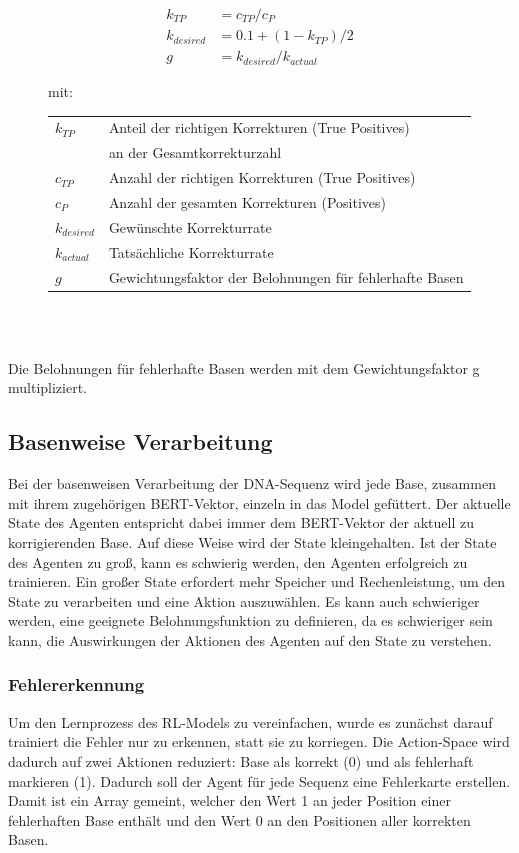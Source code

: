 \documentclass[oneside,bibliography=totocnumbered,BCOR=5mm]{scrbook}%
\makeatletter
\theoremstyle{definition}
\theoremstyle{definition}
\theoremstyle{definition}
\theoremstyle{definition}
\theoremstyle{definition}
\theoremstyle{definition}
\newenvironment{conditions}[1][mit:]
  {#1 \begin{tabular}[t]{>{$}l<{$} @{${}={}$} l}}
  {\end{tabular}\\[\belowdisplayskip]}
\makeatother
\begin{document}
\begin{figure}
  \begin{align*}
    k_{TP} &= c_{TP} / c_{P} \\
    k_{desired} &= 0.1 + (1 - k_{TP} ) / 2 \\
    g &= k_{desired} / k_{actual}
  \end{align*} 
  
  \begin{conditions}
    k_{TP}      & Anteil der richtigen Korrekturen (True Positives) \\
                & an der Gesamtkorrekturzahl \\
    c_{TP}      & Anzahl der richtigen Korrekturen (True Positives) \\
    c_{P}       & Anzahl der gesamten Korrekturen (Positives) \\
    k_{desired} & Gewünschte Korrekturrate \\
    k_{actual}  & Tatsächliche Korrekturrate \\
    g           & Gewichtungsfaktor der Belohnungen für fehlerhafte Basen
  \end{conditions}
  
  \end{figure}
  \leavevmode \\

Die Belohnungen für fehlerhafte Basen werden mit dem Gewichtungsfaktor g multipliziert.



\subsection{Basenweise Verarbeitung}
Bei der basenweisen Verarbeitung der DNA-Sequenz wird jede Base, zusammen mit ihrem zugehörigen BERT-Vektor, 
einzeln in das Model gefüttert.
Der aktuelle State des Agenten entspricht dabei immer dem BERT-Vektor der aktuell zu korrigierenden Base. 
Auf diese Weise wird der State kleingehalten. Ist der State des Agenten zu groß, kann es schwierig werden, 
den Agenten erfolgreich zu trainieren. Ein großer State erfordert mehr Speicher und Rechenleistung, 
um den State zu verarbeiten und eine Aktion auszuwählen. 
Es kann auch schwieriger werden, eine geeignete Belohnungsfunktion zu definieren, 
da es schwieriger sein kann, die Auswirkungen der Aktionen des Agenten auf den State zu verstehen.\\


\subsubsection{Fehlererkennung}
Um den Lernprozess des RL-Models zu vereinfachen, wurde es zunächst darauf trainiert die Fehler nur zu erkennen, statt sie zu korriegen.
Die Action-Space wird dadurch auf zwei Aktionen reduziert: Base als korrekt (0) und als fehlerhaft markieren (1).
Dadurch soll der Agent für jede Sequenz eine Fehlerkarte erstellen. 
Damit ist ein Array gemeint, welcher den Wert 1 an jeder Position einer fehlerhaften Base enthält und den Wert 0 an den Positionen aller korrekten Basen.\\
\end{document}
